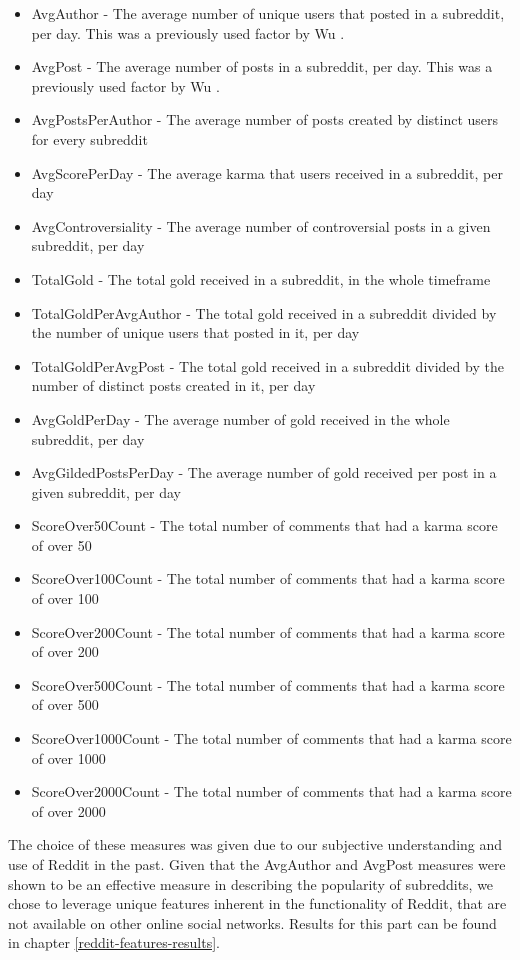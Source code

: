 \documentclass[bsc,frontabs,twoside,singlespacing,parskip,deptreport]{infthesis}
\begin{document}
\begin{itemize}
	\item AvgAuthor - The average number of unique users that posted in a subreddit, per day. This was a previously used factor by Wu \cite{masters}.
	\item AvgPost - The average number of posts in a subreddit, per day. This was a previously used factor by Wu \cite{masters}.
	\item AvgPostsPerAuthor - The average number of posts created by distinct users for every subreddit
	\item AvgScorePerDay - The average karma that users received in a subreddit, per day
	\item AvgControversiality - The average number of controversial posts in a given subreddit, per day
	\item TotalGold - The total gold received in a subreddit, in the whole timeframe
	\item TotalGoldPerAvgAuthor - The total gold received in a subreddit divided by the number of unique users that posted in it, per day
	\item TotalGoldPerAvgPost - The total gold received in a subreddit divided by the number of distinct posts created in it, per day
	\item AvgGoldPerDay - The average number of gold received in the whole subreddit, per day
	\item AvgGildedPostsPerDay - The average number of gold received per post in a given subreddit, per day
	\item ScoreOver50Count - The total number of comments that had a karma score of over 50
	\item ScoreOver100Count - The total number of comments that had a karma score of over 100
	\item ScoreOver200Count - The total number of comments that had a karma score of over 200
	\item ScoreOver500Count - The total number of comments that had a karma score of over 500
	\item ScoreOver1000Count - The total number of comments that had a karma score of over 1000
	\item ScoreOver2000Count - The total number of comments that had a karma score of over 2000
\end{itemize}

The choice of these measures was given due to our subjective understanding and use of Reddit in the past. Given that the AvgAuthor and AvgPost measures were shown to be an effective measure in describing the popularity of subreddits, we chose to leverage unique features inherent in the functionality of Reddit, that are not available on other online social networks. Results for this part can be found in chapter \ref{reddit-features-results}.
\end{document}
